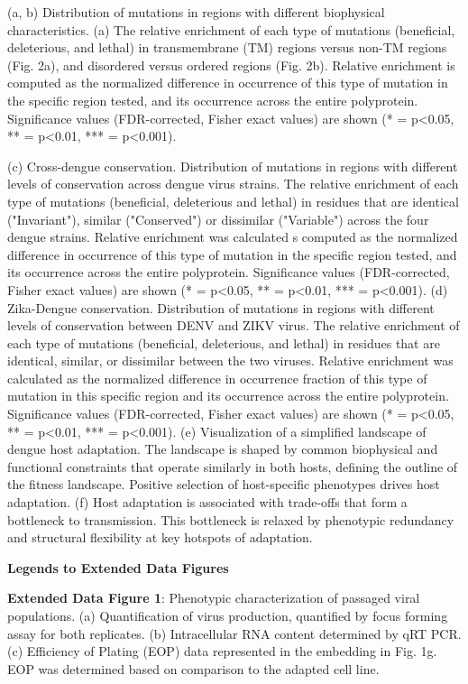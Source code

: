 \documentclass[
]{article}
\begin{document}
(a, b) Distribution of mutations in regions with different biophysical
characteristics. (a) The relative enrichment of each type of mutations
(beneficial, deleterious, and lethal) in transmembrane (TM) regions
versus non-TM regions (Fig. 2a), and disordered versus ordered regions
(Fig. 2b). Relative enrichment is computed as the normalized difference
in occurrence of this type of mutation in the specific region tested,
and its occurrence across the entire polyprotein. Significance values
(FDR-corrected, Fisher exact values) are shown (* = p\textless0.05, ** =
p\textless0.01, *** = p\textless0.001).

(c) Cross-dengue conservation. Distribution of mutations in regions with
different levels of conservation across dengue virus strains. The
relative enrichment of each type of mutations (beneficial, deleterious
and lethal) in residues that are identical ("Invariant"), similar
("Conserved") or dissimilar ("Variable") across the four dengue strains.
Relative enrichment was calculated s computed as the normalized
difference in occurrence of this type of mutation in the specific region
tested, and its occurrence across the entire polyprotein. Significance
values (FDR-corrected, Fisher exact values) are shown (* =
p\textless0.05, ** = p\textless0.01, *** = p\textless0.001). (d)
Zika-Dengue conservation. Distribution of mutations in regions with
different levels of conservation between DENV and ZIKV virus. The
relative enrichment of each type of mutations (beneficial, deleterious,
and lethal) in residues that are identical, similar, or dissimilar
between the two viruses. Relative enrichment was calculated as the
normalized difference in occurrence fraction of this type of mutation in
this specific region and its occurrence across the entire polyprotein.
Significance values (FDR-corrected, Fisher exact values) are shown (* =
p\textless0.05, ** = p\textless0.01, *** = p\textless0.001). (e)
Visualization of a simplified landscape of dengue host adaptation. The
landscape is shaped by common biophysical and functional constraints
that operate similarly in both hosts, defining the outline of the
fitness landscape. Positive selection of host-specific phenotypes drives
host adaptation. (f) Host adaptation is associated with trade-offs that
form a bottleneck to transmission. This bottleneck is relaxed by
phenotypic redundancy and structural flexibility at key hotspots of
adaptation.

\textbf{{Legends to Extended Data Figures}}

\textbf{Extended Data Figure 1}: Phenotypic characterization of passaged
viral populations. (a) Quantification of virus production, quantified by
focus forming assay for both replicates. (b) Intracellular RNA content
determined by qRT PCR. (c) Efficiency of Plating (EOP) data represented
in the embedding in Fig. 1g. EOP was determined based on comparison to
the adapted cell line.
\end{document}
